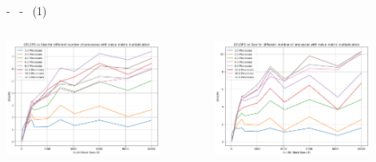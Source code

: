 \documentclass[compress]{beamer}
\begin{document}
\begin{frame}{\secname \text{ }- \subsecname\ \text{ }- \subsubsecname\ (1)}
\begin{columns}
\begin{minipage}{1\textwidth}
            \end{minipage}
            \begin{minipage}{1\textwidth}
                \centering
                \begin{adjustbox}{margin=0cm 0cm 0cm 0cm, center} %
                    \includegraphics[width=0.8\textwidth, frame]{resources/rettangolari_k64_naive.png}
                \end{adjustbox}
                \begin{adjustbox}{margin=0cm 0cm 0cm 0.1cm, center} %
                    \includegraphics[width=0.8\textwidth, frame]{resources/rettangolari_k156_naive.png}
                \end{adjustbox}
            \end{minipage}
    \end{columns}
\end{frame}
\end{document}
